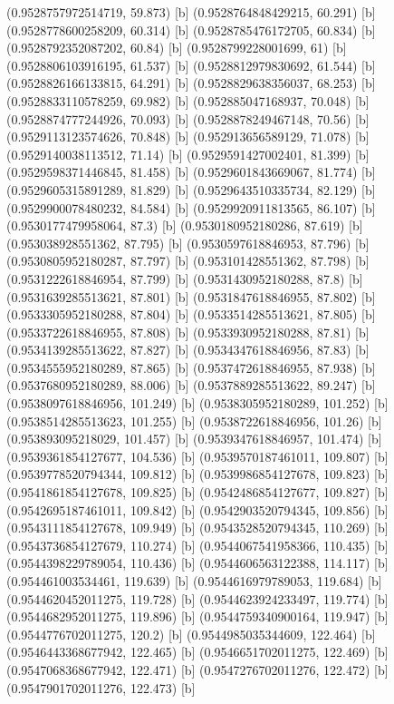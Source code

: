 {{{(0.9528757972514719, 59.873) [b] 
(0.9528764848429215, 60.291) [b] 
(0.9528778600258209, 60.314) [b] 
(0.9528785476172705, 60.834) [b] 
(0.9528792352087202, 60.84) [b] 
(0.9528799228001699, 61) [b] 
(0.9528806103916195, 61.537) [b] 
(0.9528812979830692, 61.544) [b] 
(0.9528826166133815, 64.291) [b] 
(0.9528829638356037, 68.253) [b] 
(0.9528833110578259, 69.982) [b] 
(0.952885047168937, 70.048) [b] 
(0.9528874777244926, 70.093) [b] 
(0.9528878249467148, 70.56) [b] 
(0.9529113123574626, 70.848) [b] 
(0.952913656589129, 71.078) [b] 
(0.9529140038113512, 71.14) [b] 
(0.9529591427002401, 81.399) [b] 
(0.9529598371446845, 81.458) [b] 
(0.9529601843669067, 81.774) [b] 
(0.9529605315891289, 81.829) [b] 
(0.9529643510335734, 82.129) [b] 
(0.9529900078480232, 84.584) [b] 
(0.9529920911813565, 86.107) [b] 
(0.9530177479958064, 87.3) [b] 
(0.9530180952180286, 87.619) [b] 
(0.953038928551362, 87.795) [b] 
(0.9530597618846953, 87.796) [b] 
(0.9530805952180287, 87.797) [b] 
(0.953101428551362, 87.798) [b] 
(0.9531222618846954, 87.799) [b] 
(0.9531430952180288, 87.8) [b] 
(0.9531639285513621, 87.801) [b] 
(0.9531847618846955, 87.802) [b] 
(0.9533305952180288, 87.804) [b] 
(0.9533514285513621, 87.805) [b] 
(0.9533722618846955, 87.808) [b] 
(0.9533930952180288, 87.81) [b] 
(0.9534139285513622, 87.827) [b] 
(0.9534347618846956, 87.83) [b] 
(0.9534555952180289, 87.865) [b] 
(0.9537472618846955, 87.938) [b] 
(0.9537680952180289, 88.006) [b] 
(0.9537889285513622, 89.247) [b] 
(0.9538097618846956, 101.249) [b] 
(0.9538305952180289, 101.252) [b] 
(0.9538514285513623, 101.255) [b] 
(0.9538722618846956, 101.26) [b] 
(0.953893095218029, 101.457) [b] 
(0.9539347618846957, 101.474) [b] 
(0.9539361854127677, 104.536) [b] 
(0.9539570187461011, 109.807) [b] 
(0.9539778520794344, 109.812) [b] 
(0.9539986854127678, 109.823) [b] 
(0.9541861854127678, 109.825) [b] 
(0.9542486854127677, 109.827) [b] 
(0.9542695187461011, 109.842) [b] 
(0.9542903520794345, 109.856) [b] 
(0.9543111854127678, 109.949) [b] 
(0.9543528520794345, 110.269) [b] 
(0.9543736854127679, 110.274) [b] 
(0.9544067541958366, 110.435) [b] 
(0.9544398229789054, 110.436) [b] 
(0.9544606563122388, 114.117) [b] 
(0.954461003534461, 119.639) [b] 
(0.9544616979789053, 119.684) [b] 
(0.9544620452011275, 119.728) [b] 
(0.9544623924233497, 119.774) [b] 
(0.9544682952011275, 119.896) [b] 
(0.9544759340900164, 119.947) [b] 
(0.9544776702011275, 120.2) [b] 
(0.9544985035344609, 122.464) [b] 
(0.9546443368677942, 122.465) [b] 
(0.9546651702011275, 122.469) [b] 
(0.9547068368677942, 122.471) [b] 
(0.9547276702011276, 122.472) [b] 
(0.9547901702011276, 122.473) [b] 
}}}
